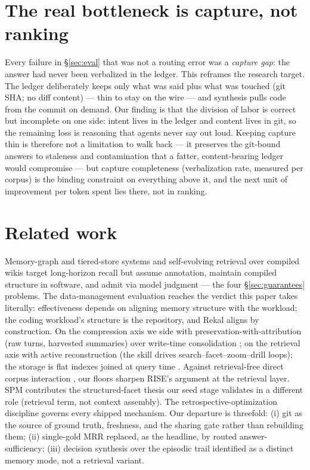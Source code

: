 \documentclass[twocolumn,10pt]{article}
\begin{document}
\section{The real bottleneck is capture, not ranking}\label{sec:capture}

Every failure in \S\ref{sec:eval} that was not a routing error was a \emph{capture gap}: the answer had never been verbalized in the ledger. This reframes the research target. The ledger deliberately keeps only what was said plus what was touched (git SHA; no diff content) --- thin to stay on the wire --- and synthesis pulls code from the commit on demand. Our finding is that the division of labor is correct but incomplete on one side: intent lives in the ledger and content lives in git, so the remaining loss is reasoning that agents never say out loud. Keeping capture thin is therefore not a limitation to walk back --- it preserves the git-bound answers to staleness and contamination that a fatter, content-bearing ledger would compromise --- but capture completeness (verbalization rate, measured per corpus) is the binding constraint on everything above it, and the next unit of improvement per token spent lies there, not in ranking.

\section{Related work}\label{sec:related}

Memory-graph and tiered-store systems \citep{mragent2026,adamem2026,automem2026} and self-evolving retrieval over compiled wikis \citep{llmwiki2026} target long-horizon recall but assume annotation, maintain compiled structure in software, and admit via model judgment --- the four \S\ref{sec:guarantees} problems. The data-management evaluation \citep{anms2026} reaches the verdict this paper takes literally: effectiveness depends on aligning memory structure with the workload; the coding workload's structure is the repository, and Rekal aligns by construction. On the compression axis we side with preservation-with-attribution \citep{emem2025} (raw turns, harvested summaries) over write-time consolidation \citep{adamem2026}; on the retrieval axis with active reconstruction \citep{mragent2026} (the skill drives search--facet--zoom--drill loops); the storage is flat indexes joined at query time \citep{sag2026}. Against retrieval-free direct corpus interaction \citep{dci2026,grepseek2026}, our floors sharpen RISE's argument \citep{rise2026} at the retrieval layer. SPM \citep{spm2026} contributes the structured-facet thesis our seed stage validates in a different role (retrieval term, not context assembly). The retrospective-optimization discipline \citep{rho2026} governs every shipped mechanism. Our departure is threefold: (i) git as the source of ground truth, freshness, and the sharing gate rather than rebuilding them; (ii) single-gold MRR replaced, as the headline, by routed answer-sufficiency; (iii) decision synthesis over the episodic trail identified as a distinct memory mode, not a retrieval variant.
\end{document}
